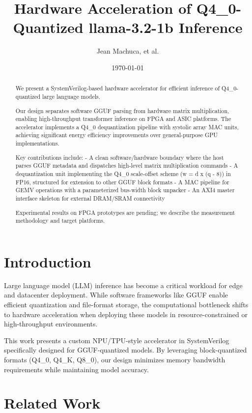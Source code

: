 \documentclass[12pt, conference]{ieeeconf}
\title{Hardware Acceleration of Q4\_0-Quantized llama-3.2-1b Inference}
\author{Jean Machuca, et al.}
\date{\today}
\begin{document}
\maketitle

\begin{abstract}
We present a SystemVerilog-based hardware accelerator for efficient inference of Q4\_0-quantized large language models.

Our design separates software GGUF parsing from hardware matrix multiplication, enabling high-throughput transformer inference on FPGA and ASIC platforms. The accelerator implements a Q4\_0 dequantization pipeline with systolic array MAC units, achieving significant energy efficiency improvements over general-purpose GPU implementations.

Key contributions include:
- A clean software/hardware boundary where the host parses GGUF metadata and dispatches high-level matrix multiplication commands
- A dequantization unit implementing the Q4\_0 scale-offset scheme (w = d x (q - 8)) in FP16, structured for extension to other GGUF block formats
- A MAC pipeline for GEMV operations with a parameterized bus-width block unpacker
- An AXI4 master interface skeleton for external DRAM/SRAM connectivity

Experimental results on FPGA prototypes are pending; we describe the measurement methodology and target platforms.
\end{abstract}

\section{Introduction}

Large language model (LLM) inference has become a critical workload for edge and datacenter deployment. While software frameworks like GGUF enable efficient quantization and file-format storage, the computational bottleneck shifts to hardware acceleration when deploying these models in resource-constrained or high-throughput environments.

This work presents a custom NPU/TPU-style accelerator in SystemVerilog specifically designed for GGUF-quantized models. By leveraging block-quantized formats (Q4\_0, Q4\_K, Q8\_0), our design minimizes memory bandwidth requirements while maintaining model accuracy.

\section{Related Work}
\end{document}
